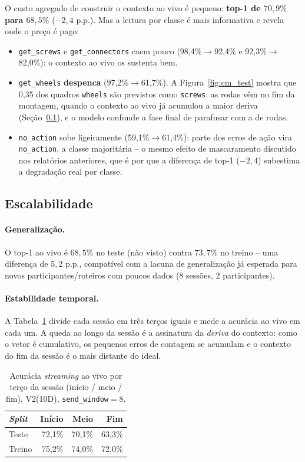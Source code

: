 \documentclass[11pt]{article}
\begin{document}
O custo agregado de construir o contexto ao vivo é pequeno: \textbf{top-1 de
$70{,}9\%$ para $68{,}5\%$} ($-2{,}4$ p.p.). Mas a leitura por classe é mais
informativa e revela onde o preço é pago:

\begin{itemize}
  \item \texttt{get\_screws} e \texttt{get\_connectors} caem pouco (98,4\%$\to$92,4\%
    e 92,3\%$\to$82,0\%): o contexto ao vivo os sustenta bem.
  \item \texttt{get\_wheels} \textbf{despenca} (97,2\%$\to$61,7\%). A
    Figura~\ref{fig:cm_test} mostra que 0,35 dos quadros \texttt{wheels} são
    previstos como \texttt{screws}: as rodas vêm no fim da montagem, quando o
    contexto ao vivo já acumulou a maior deriva (Seção~\ref{sec:escala}), e o
    modelo confunde a fase final de parafusar com a de rodas.
  \item \texttt{no\_action} sobe ligeiramente (59,1\%$\to$61,4\%): parte dos
    erros de ação vira \texttt{no\_action}, a classe majoritária -- o mesmo
    efeito de mascaramento discutido nos relatórios anteriores, que é por que a
    diferença de top-1 ($-2{,}4$) subestima a degradação real por classe.
\end{itemize}

\subsection{Escalabilidade}
\label{sec:escala}

\paragraph{Generalização.} O top-1 ao vivo é $68{,}5\%$ no teste (não visto)
contra $73{,}7\%$ no treino -- uma diferença de $5{,}2$ p.p., compatível com a
lacuna de generalização já esperada para novos participantes/roteiros com poucos
dados (8 sessões, 2 participantes).

\paragraph{Estabilidade temporal.} A Tabela~\ref{tab:temporal} divide cada sessão
em três terços iguais e mede a acurácia ao vivo em cada um. A queda ao longo da
sessão é a assinatura da \emph{deriva} do contexto: como o vetor é cumulativo, os
pequenos erros de contagem se acumulam e o contexto do fim da sessão é o mais
distante do ideal.

\begin{table}[h]
\centering
\caption{Acurácia \emph{streaming} ao vivo por terço da sessão (início / meio /
fim), V2(10D), \texttt{send\_window}$=8$.}
\label{tab:temporal}
\begin{tabular}{lrrr}
\toprule
\emph{Split} & Início & Meio & Fim \\
\midrule
Teste  & 72,1\% & 70,1\% & 63,3\% \\
Treino & 75,2\% & 74,0\% & 72,0\% \\
\bottomrule
\end{tabular}
\end{table}
\end{document}
